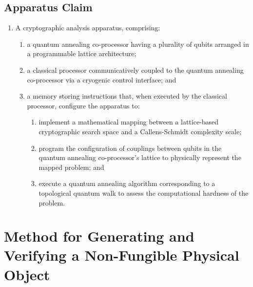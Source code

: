 \documentclass{article}
\begin{document}
\subsection{Apparatus Claim}
\begin{enumerate}
    \item[1.] A cryptographic analysis apparatus, comprising:
    \begin{enumerate}
        \item[(a)] a quantum annealing co-processor having a plurality of qubits arranged in a programmable lattice architecture;
        \item[(b)] a classical processor communicatively coupled to the quantum annealing co-processor via a cryogenic control interface; and
        \item[(c)] a memory storing instructions that, when executed by the classical processor, configure the apparatus to:
        \begin{enumerate}
            \item[(i)] implement a mathematical mapping between a lattice-based cryptographic search space and a Callens-Schmidt complexity scale;
            \item[(ii)] program the configuration of couplings between qubits in the quantum annealing co-processor's lattice to physically represent the mapped problem; and
            \item[(iii)] execute a quantum annealing algorithm corresponding to a topological quantum walk to assess the computational hardness of the problem.
        \end{enumerate}
    \end{enumerate}
\end{enumerate}

\section{Method for Generating and Verifying a Non-Fungible Physical Object}
\end{document}
